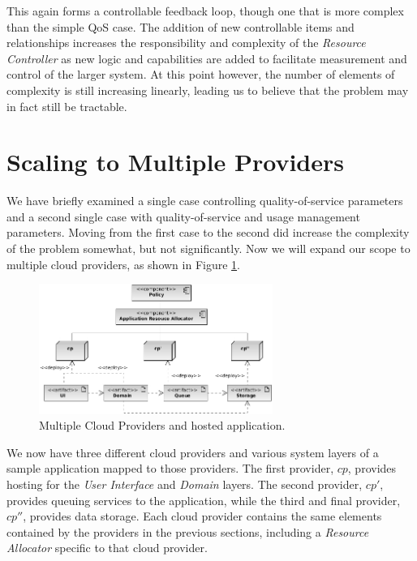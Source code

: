 \documentclass[times, 10pt,twocolumn]{article}
\begin{document}
This again forms a controllable feedback loop, though one that is more complex than the simple QoS case.  The addition of new controllable items and relationships increases the responsibility and complexity of the \textit{Resource Controller} as new logic and capabilities are added to facilitate measurement and control of the larger system.  At this point however, the number of elements of complexity is still increasing linearly, leading us to believe that the problem may in fact still be tractable.

\section{Scaling to Multiple Providers}\label{sec:multiple}
We have briefly examined a single case controlling quality-of-service parameters and a second single case with quality-of-service and usage management parameters.  Moving from the first case to the second did increase the complexity of the problem somewhat, but not significantly.  Now we will expand our scope to multiple cloud providers, as shown in Figure \ref{fig:multiple}.

\begin{figure}[!t]
\centering
\includegraphics[width=3in]{Multiple}
\caption{Multiple Cloud Providers and hosted application.}
\label{fig:multiple}
\end{figure}

We now have three different cloud providers and various system layers of a sample application mapped to those providers.  The first provider, $ cp $, provides hosting for the \textit{User Interface} and \textit{Domain} layers.  The second provider, $ cp' $, provides queuing services to the application, while the third and final provider, $ cp'' $, provides data storage.  Each cloud provider contains the same elements contained by the providers in the previous sections, including a \textit{Resource Allocator} specific to that cloud provider.
\end{document}
